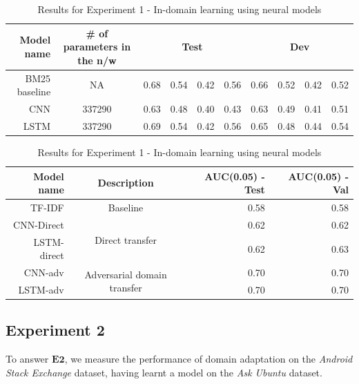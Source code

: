 \documentclass{sigkddExp}
\begin{document}
\begin{table}[h]
    \centering
    \begin{tabular}{r | c | r r r r | r r r r}
         Model name
         & \# of parameters in the n/w
         & \multicolumn{4}{c|}{Test}
         & \multicolumn{4}{c}{Dev}
         \\
         \toprule
         BM25 baseline
         & NA
         & 0.68
         & 0.54
         & 0.42
         & 0.56
         & 0.66
         & 0.52
         & 0.42
         & 0.52
         \\
         \midrule
         CNN
         & 337290
         & 0.63
         & 0.48
         & 0.40
         & 0.43
         & 0.63
         & 0.49
         & 0.41
         & 0.51
         \\
         \midrule
         LSTM
         & 337290
         & 0.69
         & 0.54
         & 0.42
         & 0.56
         & 0.65
         & 0.48
         & 0.44
         & 0.54
         
    \end{tabular}
    \caption{Results for Experiment 1 - In-domain learning using neural models}
    \label{tab:exp1}
    
    
    \centering
    \begin{tabular}{r | c | r r}
    Model name
    & Description
    & AUC(0.05) - Test
    & AUC(0.05) - Val
    \\
    \toprule
    TF-IDF
    & Baseline
    & 0.58
    & 0.58
    \\
    \midrule
    CNN-Direct
    & \multirow{2}{*}{Direct transfer}
    & 0.62
    & 0.62
    \\
    
    LSTM-direct
    & 
    & 0.62
    & 0.63
    \\
    \midrule
    CNN-adv
    & \multirow{2}{*}{Adversarial domain transfer}
    & 0.70
    & 0.70
    \\
    
    LSTM-adv
    &
    & 0.70
    & 0.70
    \\
    \bottomrule
    \end{tabular}
    
\end{table}


\subsection{Experiment 2} 
To answer $\mathbf{E2}$, we measure the performance of domain adaptation on the \textit{Android Stack Exchange} dataset, having learnt a model on the \textit{Ask Ubuntu} dataset. 
\end{document}
